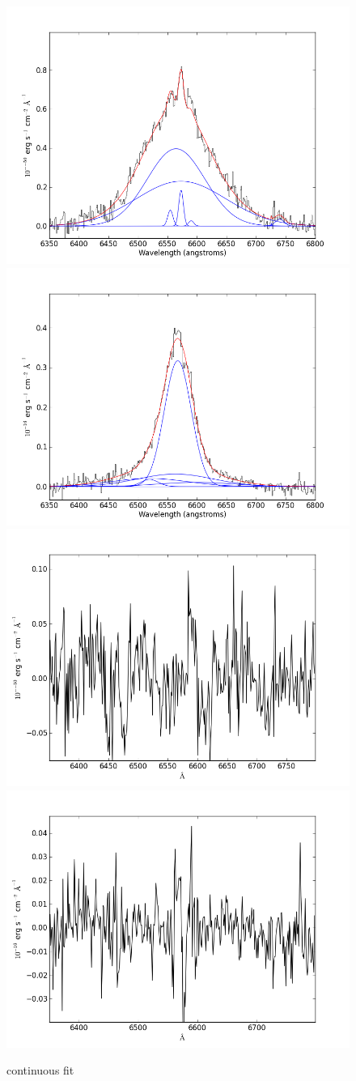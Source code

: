 \documentclass[usenatbib]{mn2e}
\begin{document}
\newpage



\begin{figure}
\begin{center}
\includegraphics[width=0.46\linewidth,angle=0]{Halpha_12.png}
\vspace{5mm}
\includegraphics[width=0.49\linewidth,angle=0]{Halpha_13.png}\\
\includegraphics[width=0.46\linewidth,angle=0]{Halpha_res_12.png}
\hspace{5mm}
\includegraphics[width=0.49\linewidth,angle=0]{Halpha_res_13.png}\\
\end{center} 
\caption{continuous fit \label{fig:landscape}}   
\end{figure}
\end{document}
